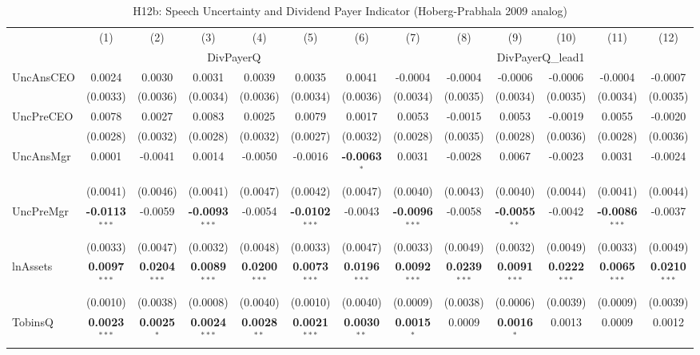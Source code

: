 \documentclass[11pt,a4paper]{article}
\begin{document}
\begin{table}[htbp]
\centering
\caption{H12b: Speech Uncertainty and Dividend Payer Indicator (Hoberg-Prabhala 2009 analog)}
\label{tab:h12b}
\scriptsize
\begin{tabular}{lcccccccccccc}
\toprule
 & (1) & (2) & (3) & (4) & (5) & (6) & (7) & (8) & (9) & (10) & (11) & (12) \\
 & \multicolumn{6}{c}{DivPayerQ} & \multicolumn{6}{c}{DivPayerQ\_lead1} \\
\cmidrule(lr){2-7} \cmidrule(lr){8-13}
\midrule
UncAnsCEO & 0.0024 & 0.0030 & 0.0031 & 0.0039 & 0.0035 & 0.0041 & -0.0004 & -0.0004 & -0.0006 & -0.0006 & -0.0004 & -0.0007 \\
 & (0.0033) & (0.0036) & (0.0034) & (0.0036) & (0.0034) & (0.0036) & (0.0034) & (0.0035) & (0.0034) & (0.0035) & (0.0034) & (0.0035) \\
UncPreCEO & 0.0078 & 0.0027 & 0.0083 & 0.0025 & 0.0079 & 0.0017 & 0.0053 & -0.0015 & 0.0053 & -0.0019 & 0.0055 & -0.0020 \\
 & (0.0028) & (0.0032) & (0.0028) & (0.0032) & (0.0027) & (0.0032) & (0.0028) & (0.0035) & (0.0028) & (0.0036) & (0.0028) & (0.0036) \\
UncAnsMgr & 0.0001 & -0.0041 & 0.0014 & -0.0050 & -0.0016 & \textbf{-0.0063}$^{*}$ & 0.0031 & -0.0028 & 0.0067 & -0.0023 & 0.0031 & -0.0024 \\
 & (0.0041) & (0.0046) & (0.0041) & (0.0047) & (0.0042) & (0.0047) & (0.0040) & (0.0043) & (0.0040) & (0.0044) & (0.0041) & (0.0044) \\
UncPreMgr & \textbf{-0.0113}$^{***}$ & -0.0059 & \textbf{-0.0093}$^{***}$ & -0.0054 & \textbf{-0.0102}$^{***}$ & -0.0043 & \textbf{-0.0096}$^{***}$ & -0.0058 & \textbf{-0.0055}$^{**}$ & -0.0042 & \textbf{-0.0086}$^{***}$ & -0.0037 \\
 & (0.0033) & (0.0047) & (0.0032) & (0.0048) & (0.0033) & (0.0047) & (0.0033) & (0.0049) & (0.0032) & (0.0049) & (0.0033) & (0.0049) \\
\midrule
lnAssets & \textbf{0.0097}$^{***}$ & \textbf{0.0204}$^{***}$ & \textbf{0.0089}$^{***}$ & \textbf{0.0200}$^{***}$ & \textbf{0.0073}$^{***}$ & \textbf{0.0196}$^{***}$ & \textbf{0.0092}$^{***}$ & \textbf{0.0239}$^{***}$ & \textbf{0.0091}$^{***}$ & \textbf{0.0222}$^{***}$ & \textbf{0.0065}$^{***}$ & \textbf{0.0210}$^{***}$ \\
 & (0.0010) & (0.0038) & (0.0008) & (0.0040) & (0.0010) & (0.0040) & (0.0009) & (0.0038) & (0.0006) & (0.0039) & (0.0009) & (0.0039) \\
TobinsQ & \textbf{0.0023}$^{***}$ & \textbf{0.0025}$^{*}$ & \textbf{0.0024}$^{***}$ & \textbf{0.0028}$^{**}$ & \textbf{0.0021}$^{***}$ & \textbf{0.0030}$^{**}$ & \textbf{0.0015}$^{*}$ & 0.0009 & \textbf{0.0016}$^{*}$ & 0.0013 & 0.0009 & 0.0012 \\

\end{tabular}
\end{table}
\end{document}
